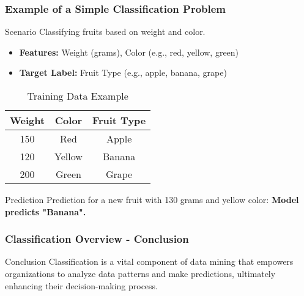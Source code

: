 \documentclass[aspectratio=169]{beamer}
\begin{document}
\begin{frame}[fragile]
    \frametitle{Example of a Simple Classification Problem}
    \begin{block}{Scenario}
        Classifying fruits based on weight and color.
    \end{block}
    \begin{itemize}
        \item \textbf{Features:} Weight (grams), Color (e.g., red, yellow, green)
        \item \textbf{Target Label:} Fruit Type (e.g., apple, banana, grape)
    \end{itemize}
    \begin{table}[ht]
        \centering
        \begin{tabular}{|c|c|c|}
            \hline
            Weight & Color & Fruit Type \\
            \hline
            150    & Red   & Apple      \\
            120    & Yellow & Banana     \\
            200    & Green  & Grape      \\
            \hline
        \end{tabular}
        \caption{Training Data Example}
    \end{table}
    \begin{block}{Prediction}
        Prediction for a new fruit with 130 grams and yellow color: \textbf{Model predicts "Banana".}
    \end{block}
\end{frame}

\begin{frame}[fragile]
    \frametitle{Classification Overview - Conclusion}
    \begin{block}{Conclusion}
        Classification is a vital component of data mining that empowers organizations to analyze data patterns and make predictions, ultimately enhancing their decision-making process. 
    \end{block}
\end{frame}
\end{document}
